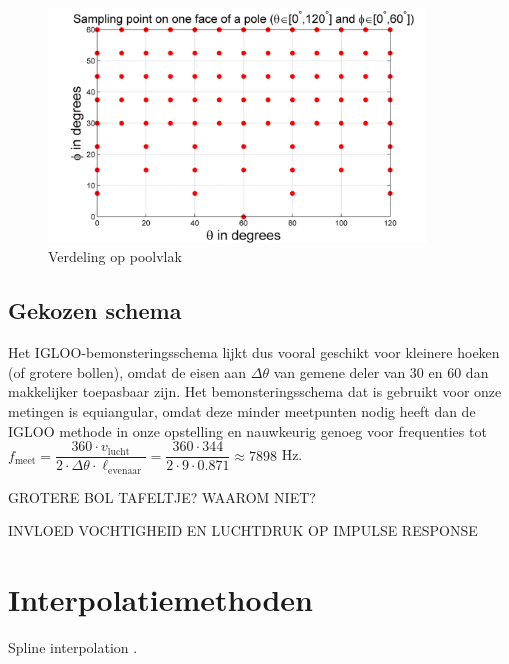 \begin{figure}[h]
    \centering
    \includegraphics[width=10cm]{afbeeldingen/poolvlak_optimaal.png}
    \caption{Verdeling op poolvlak}
    \label{fig:poolvlak}
\end{figure}

\subsection{Gekozen schema}
Het IGLOO-bemonsteringsschema lijkt dus vooral geschikt voor kleinere hoeken (of grotere bollen), omdat de eisen aan $\Delta\theta$ van gemene deler van 30 en 60 dan makkelijker toepasbaar zijn.
Het bemonsteringsschema dat is gebruikt voor onze metingen is equiangular, omdat deze minder meetpunten nodig heeft dan de IGLOO methode in onze opstelling en nauwkeurig genoeg voor frequenties tot $f_\text{meet}=\dfrac{360\cdot v_\text{lucht}}{2\cdot\Delta\theta\cdot\ell_\text{evenaar}}=\dfrac{360\cdot344}{2\cdot9\cdot0.871}\approx7898$ Hz.

GROTERE BOL TAFELTJE? WAAROM NIET?

INVLOED VOCHTIGHEID EN LUCHTDRUK OP IMPULSE RESPONSE

\section{Interpolatiemethoden}
Spline interpolation \cite{book:vuik}.